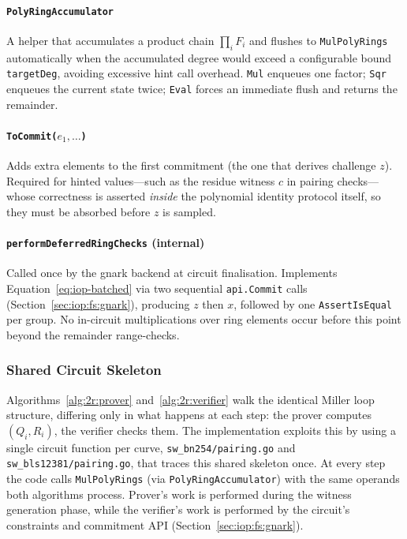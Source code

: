 \paragraph{\texttt{PolyRingAccumulator}}
A helper that accumulates a product chain $\prod_i F_i$ and flushes to
\texttt{MulPolyRings} automatically when the accumulated degree would exceed a
configurable bound \texttt{targetDeg}, avoiding excessive hint call overhead.
\texttt{Mul} enqueues one factor; \texttt{Sqr} enqueues the current state
twice; \texttt{Eval} forces an immediate flush and returns the remainder.

\paragraph{\texttt{ToCommit($e_1,\ldots$)}}
Adds extra elements to the first commitment (the one that derives challenge
$z$).  Required for hinted values—such as the residue witness $c$ in pairing
checks—whose correctness is asserted \emph{inside} the polynomial identity
protocol itself, so they must be absorbed before $z$ is sampled.

\paragraph{\texttt{performDeferredRingChecks} (internal)}
Called once by the gnark backend at circuit finalisation.  Implements 
Equation~\eqref{eq:iop-batched} via two sequential \texttt{api.Commit} calls
(Section~\ref{sec:iop:fs:gnark}), producing $z$ then $x$, followed by one
\texttt{AssertIsEqual} per group.  No in-circuit multiplications over ring
elements occur before this point beyond the remainder range-checks.

\subsubsection{Shared Circuit Skeleton}
Algorithms~\ref{alg:2r:prover} and~\ref{alg:2r:verifier} walk the identical Miller loop structure, differing only in what happens at each step: the prover computes $(Q_i, R_i)$, the verifier checks them. The implementation exploits this by using a single circuit function per curve, \texttt{sw\_bn254/pairing.go} and \texttt{sw\_bls12381/pairing.go}, that traces this shared skeleton once. At every step the code calls \texttt{MulPolyRings} (via \texttt{PolyRingAccumulator}) with the same operands both algorithms process. Prover's work is performed during the witness generation phase, while the verifier's work is performed by the circuit's constraints and commitment API (Section~\ref{sec:iop:fs:gnark}).

